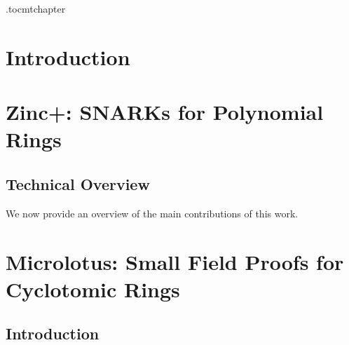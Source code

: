 \documentclass[11pt]{report}
\begin{document}
	
	
\hypersetup{pageanchor=false}





\hypersetup{pageanchor=true}
\setcounter{page}{3}

\etocdepthtag.toc{mtchapter}
\begin{singlespace}
\tableofcontents
\end{singlespace}



\newpage
{}


\chapter{Introduction}
\label{ch:intro}



\chapter{Zinc+: SNARKs for Polynomial Rings}
\label{ch:zinc}


\section{Technical Overview}
We now provide an overview of the main contributions of this work.


% 
% 






\chapter{Microlotus: Small Field Proofs for Cyclotomic Rings}
\label{ch:microlotus}

\section{Introduction}






% 
% 
\end{document}
